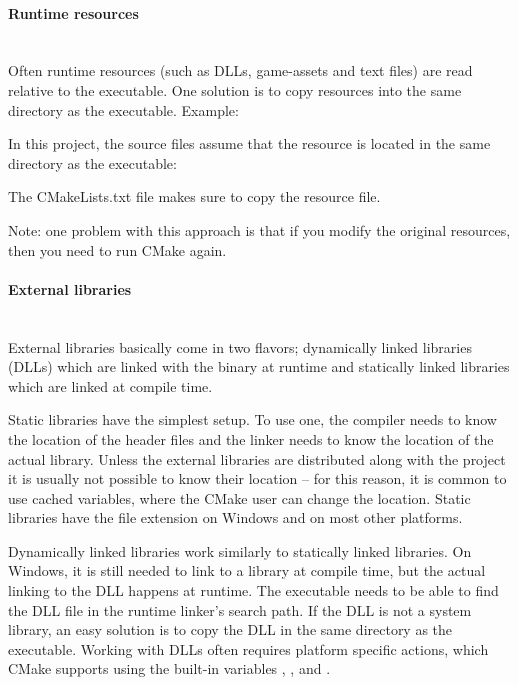 \documentclass[11pt,a4paper,landscape]{scrartcl} %
\newcommand{\sectiontitle}[1]{\paragraph{#1} \ \\} %
\begin{document}
\begin{multicols}{2}


\sectiontitle{Runtime resources}

Often runtime resources (such as DLLs, game-assets and text files) are read relative to the executable. One solution is to copy resources into the same directory as the executable. Example:

\vspace{\baselineskip} %
\noindent{}

In this project, the source files assume that the resource is located in the same directory as the executable:



The CMakeLists.txt file makes sure to copy the resource file. 



Note: one problem with this approach is that if you modify the original resources, then you need to run CMake again.

\sectiontitle{External libraries}

External libraries basically come in two flavors; dynamically linked libraries (DLLs) which are linked with the binary at runtime and statically linked libraries which are linked at compile time.

Static libraries have the simplest setup. To use one, the compiler needs to know the location of the header files and the linker needs to know the location of the actual library. Unless the external libraries are distributed along with the project it is usually not possible to know their location – for this reason, it is common to use cached variables, where the CMake user can change the location. Static libraries have the file extension  on Windows and  on most other platforms. 



Dynamically linked libraries work similarly to statically linked libraries. On Windows, it is still needed to link to a library at compile time, but the actual linking to the DLL happens at runtime. The executable needs to be able to find the DLL file in the runtime linker's search path. If the DLL is not a system library, an easy solution is to copy the DLL in the same directory as the executable. Working with DLLs often requires platform specific actions, which CMake supports using the built-in variables , , and .


\end{multicols}
\end{document}
